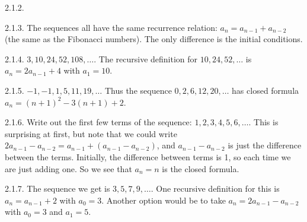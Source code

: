 \begin {itemize}
\begin{ans}{2.1.2.}
\end{ans}
\begin{ans}{2.1.3.}
		The sequences all have the same recurrence relation: $a_n = a_{n-1} + a_{n-2}$ (the same as the Fibonacci numbers).  The only difference is the initial conditions.
	
\end{ans}
\begin{ans}{2.1.4.}
		$3, 10, 24, 52, 108,\ldots$.  The recursive definition for $10, 24, 52, \ldots$ is $a_n = 2a_{n-1} + 4$ with $a_1 = 10$.
	
\end{ans}
\begin{ans}{2.1.5.}
		$-1, -1, 1, 5, 11, 19,\ldots$  Thus the sequence $0, 2, 6, 12, 20,\ldots$ has closed formula $a_n = (n+1)^2 - 3(n+1) + 2$.
	
\end{ans}
\begin{ans}{2.1.6.}
		Write out the first few terms of the sequence: $1, 2, 3, 4, 5, 6,\ldots$.  This is surprising at first, but note that we could write $2a_{n-1} - a_{n-2} = a_{n-1} + (a_{n-1} -a_{n-2})$, and $a_{n-1} - a_{n-2}$ is just the difference between the terms.  Initially, the difference between terms is 1, so each time we are just adding one.  So we see that $a_n = n$ is the closed formula.
	
\end{ans}
\begin{ans}{2.1.7.}
		The sequence we get is $3, 5, 7, 9, \ldots$.  One recursive definition for this is $a_n = a_{n-1} + 2$ with $a_0 = 3$.  Another option would be to take $a_n = 2a_{n-1} - a_{n-2}$ with $a_0 = 3$ and $a_1 = 5$.
	
\end{ans}
\protect \end {itemize}
